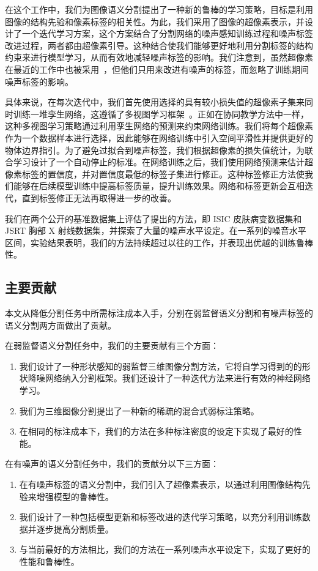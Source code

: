 在这个工作中，我们为图像语义分割提出了一种新的鲁棒的学习策略，目标是利用图像的结构先验和像素标签的相关性。为此，我们采用了图像的超像素表示，并设计了一个迭代学习方案，这个方案结合了分割网络的噪声感知训练过程和噪声标签改进过程，两者都由超像素引导。这种结合使我们能够更好地利用分割标签的结构约束来进行模型学习，从而有效地减轻噪声标签的影响。我们注意到，虽然超像素在最近的工作中也被采用~\cite{li2019supervised}，但他们只用来改进有噪声的标签，而忽略了训练期间噪声标签的影响。

具体来说，在每次迭代中，我们首先使用选择的具有较小损失值的超像素子集来同时训练一堆孪生网络，这遵循了多视图学习框架~\cite{Han2018CoteachingRT,Wei2020CombatingNL}。正如在协同教学方法中一样，这种多视图学习策略通过利用孪生网络的预测来约束网络训练。我们将每个超像素作为一个数据样本进行选择，因此能够在网络训练中引入空间平滑性并提供更好的物体边界指引。为了避免过拟合到噪声标签，我们根据超像素的损失值统计，为联合学习设计了一个自动停止的标准。在网络训练之后，我们使用网络预测来估计超像素标签的置信度，并对置信度最低的标签子集进行修正。这种标签修正方法使我们能够在后续模型训练中提高标签质量，提升训练效果。网络和标签更新会互相迭代，直到标签修正无法再取得进一步的改善。

我们在两个公开的基准数据集上评估了提出的方法，即 ISIC 皮肤病变数据集\citep{Gutman2018SkinLA}和 JSRT 胸部 X 射线数据集\citep{Ginneken2006SegmentationOA,Shiraishi2000DevelopmentOA}，并探索了大量的噪声水平设定。在一系列的噪音水平区间，实验结果表明，我们的方法持续超过以往的工作，并表现出优越的训练鲁棒性。

\subsection{主要贡献}
本文从降低分割任务中所需标注成本入手，分别在弱监督语义分割和有噪声标签的语义分割两方面做出了贡献。

在弱监督语义分割任务中，我们的主要贡献有三个方面：
\begin{enumerate}
\item 我们设计了一种形状感知的弱监督三维图像分割方法，它将自学习得到的的形状降噪网络纳入分割框架。我们还设计了一种迭代方法来进行有效的神经网络学习。
\item 我们为三维图像分割提出了一种新的稀疏的混合式弱标注策略。
\item 在相同的标注成本下，我们的方法在多种标注密度的设定下实现了最好的性能。
\end{enumerate}


在有噪声的语义分割任务中，我们的贡献分以下三方面：
\begin{enumerate}
    \item 在有噪声标签的语义分割中，我们引入了超像素表示，以通过利用图像结构先验来增强模型的鲁棒性。
    \item 我们设计了一种包括模型更新和标签改进的迭代学习策略，以充分利用训练数据并逐步提高分割质量。
    \item 与当前最好的方法相比，我们的方法在一系列噪声水平设定下，实现了更好的性能和鲁棒性。
\end{enumerate}

